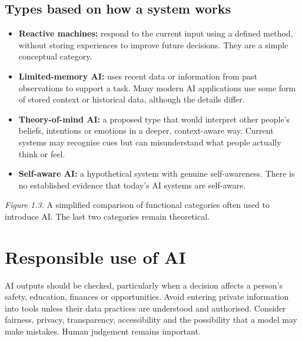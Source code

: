 \documentclass[11pt,openany,oneside]{book}
\newcommand{\keyterm}[1]{\textbf{\color{Navy}#1}}
\begin{document}
\subsection{Types based on how a system works}
\begin{itemize}
\item \keyterm{Reactive machines:} respond to the current input using a defined method, without storing experiences to improve future decisions. They are a simple conceptual category.
\item \keyterm{Limited-memory AI:} uses recent data or information from past observations to support a task. Many modern AI applications use some form of stored context or historical data, although the details differ.
\item \keyterm{Theory-of-mind AI:} a proposed type that would interpret other people's beliefs, intentions or emotions in a deeper, context-aware way. Current systems may recognise cues but can misunderstand what people actually think or feel.
\item \keyterm{Self-aware AI:} a hypothetical system with genuine self-awareness. There is no established evidence that today's AI systems are self-aware.
\end{itemize}

\begin{center}
\end{center}
\textit{Figure 1.3.} A simplified comparison of functional categories often used to introduce AI. The last two categories remain theoretical.


\section{Responsible use of AI}
AI outputs should be checked, particularly when a decision affects a person's safety, education, finances or opportunities. Avoid entering private information into tools unless their data practices are understood and authorised. Consider fairness, privacy, transparency, accessibility and the possibility that a model may make mistakes. Human judgement remains important.
\end{document}

